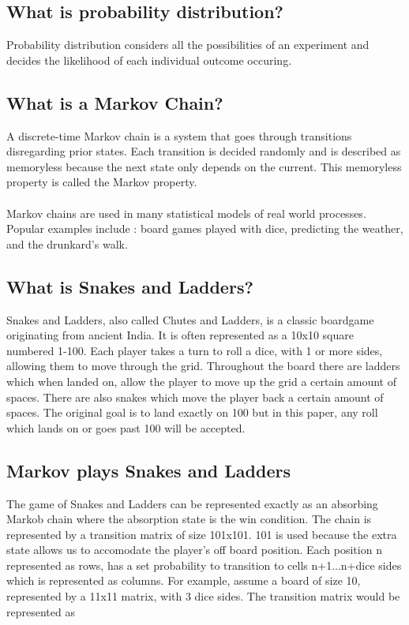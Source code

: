 \documentclass[11pt]{article}
\begin{document}
\subsection{What is probability distribution?}
Probability distribution considers all the possibilities of an experiment and decides the likelihood of each individual outcome occuring. 

\subsection{What is a Markov Chain?}
A discrete-time Markov chain is a system that goes through transitions disregarding prior states. Each transition is decided randomly and is described as memoryless because the next state only depends on the current. This memoryless property is called the Markov property. 
\\\\
Markov chains are used in many statistical models of real world processes. Popular examples include : board games played with dice, predicting the weather, and the drunkard's walk. 

\subsection{What is Snakes and Ladders?}
Snakes and Ladders, also called Chutes and Ladders, is a classic boardgame originating from ancient India. It is often represented as a 10x10 square numbered 1-100. Each player takes a turn to roll a dice, with 1 or more sides, allowing them to move through the grid. Throughout the board there are ladders which when landed on, allow the player to move up the grid a certain amount of spaces. There are also snakes which move the player back a certain amount of spaces. The original goal is to land exactly on 100 but in this paper, any roll which lands on or goes past 100 will be accepted.

\subsection{Markov plays Snakes and Ladders}
The game of Snakes and Ladders can be represented exactly as an absorbing Markob chain where the absorption state is the win condition. The chain is represented by a transition matrix of size 101x101. 101 is used because the extra state allows us to accomodate the player's off board position. Each position n represented as rows, has a set probability to transition to cells n+1...n+dice sides which is represented as columns. For example, assume a board of size 10, represented by a 11x11 matrix, with 3 dice sides. The transition matrix would be represented as
\end{document}
